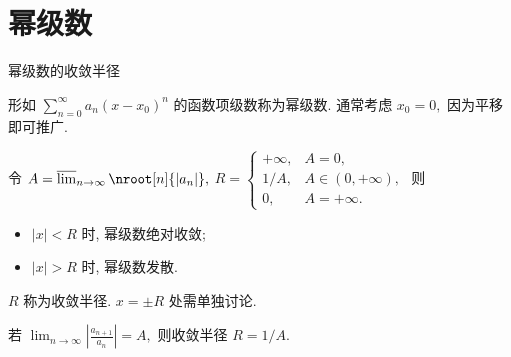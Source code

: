 
\section{幂级数}


\begin{frame}{幂级数的收敛半径}

\begin{Def}[幂级数]
形如 $\sum_{n=0}^\infty a_n (x - x_0)^n$ 的函数项级数称为幂级数. 通常考虑 $x_0 = 0,$ 因为平移即可推广.
\end{Def}

\pause

\begin{thm}
令 $A = \varlimsup_{n\to\infty} \nroot[n]{|a_n|},$ $R = \begin{cases} +\infty, & A = 0, \\ 1/A, & A \in (0, +\infty), \\ 0, & A = +\infty. \end{cases}$ 则
\begin{itemize}
\item $|x| < R$ 时, 幂级数{\color{red}绝对收敛};
\item $|x| > R$ 时, 幂级数{\color{red}发散}.
\end{itemize}
$R$ 称为收敛半径. $x = \pm R$ 处需单独讨论.
\end{thm}

\pause

\begin{thm}
若 $\lim_{n\to\infty} \left\lvert \frac{a_{n+1}}{a_n} \right\rvert = A,$ 则收敛半径 $R = 1/A.$
\end{thm}

\end{frame}


